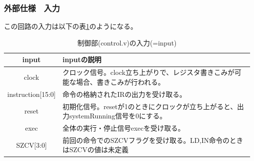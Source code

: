 \documentclass[a4j,titlepage]{jarticle}
\begin{document}
\subsubsection{外部仕様　入力}
この回路の入力は以下の表\ref{controlI}のようになる。
\begin{table}[H]
    \caption{制御部(control.v)の入力(=input)}
    \label{controlI}
    \begin{center}
    \begin {tabularx}{150mm}{|c|X|} \hline
         input & inputの説明 \\ \hline \hline
         clock & クロック信号。clock立ち上がりで、レジスタ書きこみが可能な場合、書きこみが行われる。 \\ \hline 
         instruction[15:0] & 命令の格納されたIRの出力を受け取る。 \\ \hline 
         reset & 初期化信号。resetが1のときにクロックが立ち上がると、出力systemRunning信号を0にする。 \\ \hline
         exec & 全体の実行・停止信号execを受け取る。\\ \hline
         SZCV[3:0] & 前回の命令でのSZCVフラグを受け取る。LD,IN命令のときはSZCVの値は未定義\\ \hline
    \end{tabularx}
    \end{center}
\end{table}
\end{document}
